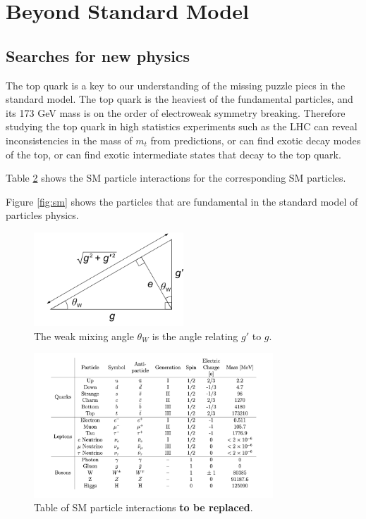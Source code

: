 \section{Beyond Standard Model}


\subsection{Searches for new physics}

The top quark is a key to our understanding of the missing puzzle piecs in the standard model. The top quark is the heaviest of the fundamental particles, and its 173 GeV mass is on the order of electroweak symmetry breaking. Therefore studying the top quark in high statistics experiments such as the LHC can reveal inconsistencies in the mass of $m_t$ from predictions, or can find exotic decay modes of the top, or can find exotic intermediate states that decay to the top quark.



Table \ref{fig:smtable} shows the SM particle interactions for the corresponding SM particles.

Figure \ref{fig:sm} shows the particles that are fundamental in the standard model of particles physics.

\begin{figure}[htbp!]
	\centering
	\includegraphics[width=0.5\textwidth]{figures/Weinberg_angle.png}
	\caption{The weak mixing angle $\theta_W$ is the angle relating $g'$ to $g$.}
	\label{fig:weinberg}
\end{figure}

 \begin{figure}[h!]
\centering
\includegraphics[width=0.8\textwidth]{figures/sm_table.png}
\caption{Table of SM particle interactions \textbf{to be replaced}.}
\label{fig:smtable}
\end{figure}






